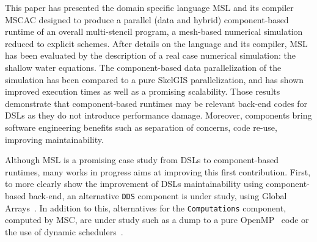This paper has presented the domain specific language MSL and its compiler MSCAC designed to produce a parallel (data and hybrid) component-based runtime of an overall multi-stencil program, \ie a mesh-based numerical simulation reduced to explicit schemes. After details on the language and its compiler, MSL has been evaluated by the description of a real case numerical simulation: the shallow water equations. The component-based data parallelization of the simulation has been compared to a pure SkelGIS parallelization, and has shown improved execution times as well as a promising scalability. Those results demonstrate that component-based runtimes may be relevant back-end codes for DSLs as they do not introduce performance damage. Moreover, components bring software engineering benefits such as separation of concerns, code re-use, improving maintainability.

Although MSL is a promising case study from DSLs to component-based runtimes, many works in progress aims at improving this first contribution. First, to more clearly show the improvement of DSLs maintainability using component-based back-end, an alternative \texttt{DDS} component is under study, using Global Arrays~\cite{Nieplocha:2006:AAP:1125980.1125985}. In addition to this, alternatives for the \texttt{Computations} component, computed by MSC, are under study such as a dump to a pure OpenMP~\cite{660313} code or the use of dynamic schedulers~\cite{Augonnet2011,Gautier:2013:XRS:2510661.2511383}. %
